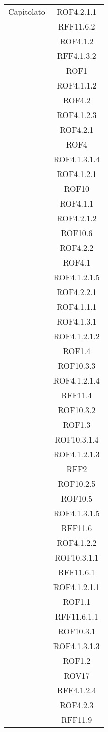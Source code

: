 \begin{longtable}{|c|c|}
\midrule
Capitolato
& ROF4.2.1.1\\
& RFF11.6.2\\
& ROF4.1.2\\
& RFF4.1.3.2\\
& ROF1\\
& ROF4.1.1.2\\
& ROF4.2\\
& ROF4.1.2.3\\
& ROF4.2.1\\
& ROF4\\
& ROF4.1.3.1.4\\
& ROF4.1.2.1\\
& ROF10\\
& ROF4.1.1\\
& ROF4.2.1.2\\
& ROF10.6\\
& ROF4.2.2\\
& ROF4.1\\
& ROF4.1.2.1.5\\
& ROF4.2.2.1\\
& ROF4.1.1.1\\
& ROF4.1.3.1\\
& ROF4.1.2.1.2\\
& ROF1.4\\
& ROF10.3.3\\
& ROF4.1.2.1.4\\
& RFF11.4\\
& ROF10.3.2\\
& ROF1.3\\
& ROF10.3.1.4\\
& ROF4.1.2.1.3\\
& RFF2\\
& ROF10.2.5\\
& ROF10.5\\
& ROF4.1.3.1.5\\
& RFF11.6\\
& ROF4.1.2.2\\
& ROF10.3.1.1\\
& RFF11.6.1\\
& ROF4.1.2.1.1\\
& ROF1.1\\
& RFF11.6.1.1\\
& ROF10.3.1\\
& ROF4.1.3.1.3\\
& ROF1.2\\
& ROV17\\
& RFF4.1.2.4\\
& ROF4.2.3\\
& RFF11.9\\

\end{longtable}
